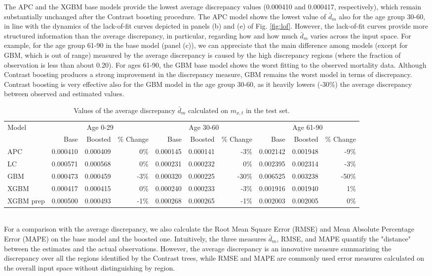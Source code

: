 \documentclass[fleqn,10pt]{wlscirep}
\begin{document}
The APC and the XGBM base models provide the lowest average discrepancy values (0.000410 and 0.000417, respectively), which remain substantially unchanged after the Contrast boosting procedure.
The APC model shows the lowest value of $\bar{d}_m$ also for the age group 30-60, in line with the dynamics of the lack-of-fit curves depicted in panels (b) and (e) of Fig. \ref{fig:lof}.
However, the lack-of-fit curves provide more structured information than the average discrepancy, in particular, regarding how and how much $\bar{d}_m$ varies across the input space. For example, for the age group 61-90 in the base model (panel (c)), we can appreciate that the main difference among models (except for GBM, which is out of range) measured by the average discrepancy is caused by the high discrepancy regions (where the fraction of observation is less than about 0.20). 
For ages 61-90, the GBM base model shows the worst fitting to the observed mortality data. Although Contrast boosting produces a strong improvement in the discrepancy measure, GBM remains the worst model in terms of discrepancy. Contrast boosting is very effective also for the GBM model in the age group 30-60, as it heavily lowers (-30\%) the average discrepancy between observed and estimated values.
%
\begin{table}[ht]
\centering
\footnotesize
\begin{tabular}{|l|r|r|r|r|r|r|r|r|r|}
\hline
\multirow{2}{*}{Model} & \multicolumn{3}{c|}{Age 0-29} & \multicolumn{3}{c|}{Age 30-60} & \multicolumn{3}{c|}{Age 61-90} \\
\cline{2-10}
			&	Base 	&	Boosted 	& \% Change &	Base 	&	Boosted 	& \% Change &	Base 	&	Boosted	& \% Change\\
\hline
APC 	&	0.000410	&	0.000409	&	0\%	&	0.000145	&	0.000141	&	-3\%	&	0.002142	&	0.001948	&	-9\%	\\
LC 	&	0.000571	&	0.000568	&	0\%	&	0.000231	&	0.000232	&	0\%	&	0.002395	&	0.002314	&	-3\%	\\
GBM 	&	0.000473	&	0.000459	&	-3\%	&	0.000320	&	0.000225	&	-30\%	&	0.006525	&	0.003238	&	-50\%	\\
XGBM 	&	0.000417	&	0.000415	&	0\%	&	0.000240	&	0.000233	&	-3\%	&	0.001916	&	0.001940	&	1\%	\\
XGBM prep 	&	0.000500	&	0.000493	&	-1\%	&	0.000268	&	0.000265	&	-1\%	&	0.002003	&	0.002005	&	0\%	\\
\hline
\end{tabular}
\caption{Values of the average discrepancy $\bar{d}_m$ calculated on $m_{x,t}$ in the test set.}
\label{tab:avecri}
\end{table}\\
For a comparison with the average discrepancy, we also calculate the Root Mean Square Error (RMSE) and Mean Absolute Percentage Error (MAPE) on the base model and the boosted one. Intuitively, the three measures $\bar{d}_m$, RMSE, and MAPE quantify the "distance" between the estimates and the actual observations. 
However, the average discrepancy is an innovative measure summarizing the discrepancy over all the regions identified by the Contrast trees, while RMSE and MAPE are commonly used error measures calculated on the overall input space without distinguishing by region. 
\end{document}
